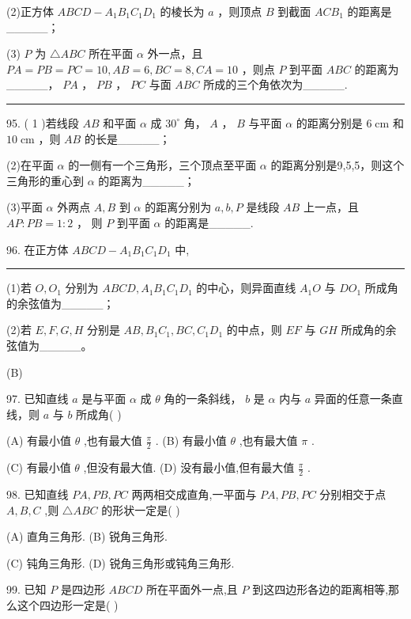\documentclass[10pt]{article}
\newcommand{\HRule}{\begin{center}\rule{0.9\linewidth}{0.2mm}\end{center}}
\begin{document}
(2)正方体 \({ABCD} - {A}_{1}{B}_{1}{C}_{1}{D}_{1}\) 的棱长为 \(a\) ，则顶点 \(B\) 到截面 \({AC}{B}_{1}\) 的距离是\_\_\_\_\_；

(3) \(P\) 为 \(\bigtriangleup {ABC}\) 所在平面 \(\alpha\) 外一点，且 \({PA} = {PB} = {PC} = {10},{AB} = 6,{BC} = 8,{CA} = {10}\) ，则点 \(P\) 到平面 \({ABC}\) 的距离为\_\_\_\_\_， \({PA}\) ， \({PB}\) ， \({PC}\) 与面 \({ABC}\) 所成的三个角依次为\_\_\_\_\_.

\HRule

95. ( 1 )若线段 \({AB}\) 和平面 \(\alpha\) 成 \({30}^{ \circ  }\) 角， \(A\) ， \(B\) 与平面 \(\alpha\) 的距离分别是 \(6\mathrm{\;{cm}}\) 和 \({10}\mathrm{\;{cm}}\) ，则 \({AB}\) 的长是\_\_\_\_\_；

(2)在平面 \(\alpha\) 的一侧有一个三角形，三个顶点至平面 \(\alpha\) 的距离分别是9,5,5，则这个三角形的重心到 \(\alpha\) 的距离为\_\_\_\_\_；

(3)平面 \(\alpha\) 外两点 \(A,B\) 到 \(\alpha\) 的距离分别为 \(a,b,P\) 是线段 \({AB}\) 上一点，且 \({AP} : {PB} = 1 : 2\) ， 则 \(P\) 到平面 \(\alpha\) 的距离是\_\_\_\_\_.

96. 在正方体 \({ABCD} - {A}_{1}{B}_{1}{C}_{1}{D}_{1}\) 中,

\HRule

(1)若 \(O,{O}_{1}\) 分别为 \({ABCD},{A}_{1}{B}_{1}{C}_{1}{D}_{1}\) 的中心，则异面直线 \({A}_{1}O\) 与 \(D{O}_{1}\) 所成角的余弦值为\_\_\_\_\_；

(2)若 \(E,F,G,H\) 分别是 \({AB},{B}_{1}{C}_{1},{BC},{C}_{1}{D}_{1}\) 的中点，则 \({EF}\) 与 \({GH}\) 所成角的余弦值为\_\_\_\_\_。

(B)

97. 已知直线 \(a\) 是与平面 \(\alpha\) 成 \(\theta\) 角的一条斜线， \(b\) 是 \(\alpha\) 内与 \(a\) 异面的任意一条直线，则 \(a\) 与 \(b\) 所成角( )

(A) 有最小值 \(\theta\) ,也有最大值 \(\frac{\pi }{2}\) . (B) 有最小值 \(\theta\) ,也有最大值 \(\pi\) .

(C) 有最小值 \(\theta\) ,但没有最大值. (D) 没有最小值,但有最大值 \(\frac{\pi }{2}\) .

98. 已知直线 \({PA},{PB},{PC}\) 两两相交成直角,一平面与 \({PA},{PB},{PC}\) 分别相交于点 \(A,B,C\) ,则 \(\bigtriangleup {ABC}\) 的形状一定是( )

(A) 直角三角形. (B) 锐角三角形.

(C) 钝角三角形. (D) 锐角三角形或钝角三角形.

99. 已知 \(P\) 是四边形 \({ABCD}\) 所在平面外一点,且 \(P\) 到这四边形各边的距离相等,那么这个四边形一定是( )
\end{document}
